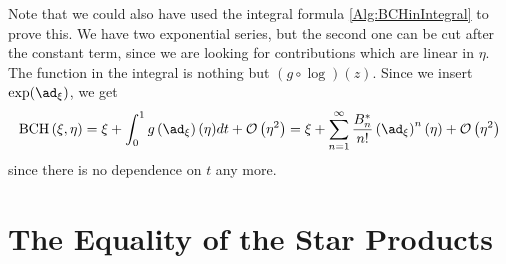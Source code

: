 \begin{remark}
	Note that we could also have used the integral formula 
	\eqref{Alg:BCHinIntegral} to prove this. We have two exponential series, 
	but the second one can be cut after the constant term, since we are 
	looking for contributions which are linear in $\eta$. The function in the 
	integral is 	nothing but $(g \circ \log)(z)$. Since we insert 
	$\exp(\ad_{\xi})$, we get
	\begin{equation*}
		\bch{\xi}{\eta}
		=
		\xi + 
		\int_0^1
		g \left( \ad_{\xi} \right)
		(\eta)
		dt
		+ \mathcal{O} \left( \eta^2 \right)
		=
		\xi +
		\sum\limits_{n = 1}^{\infty}
		\frac{B_n^*}{n!}
		\left( \ad_{\xi} \right)^n (\eta)
		+ \mathcal{O} \left( \eta^2 \right)
	\end{equation*}
	since there is no dependence on $t$ any more.
\end{remark}



\section{The Equality of the Star Products}
\label{sec:chap3_StarProductProof}

